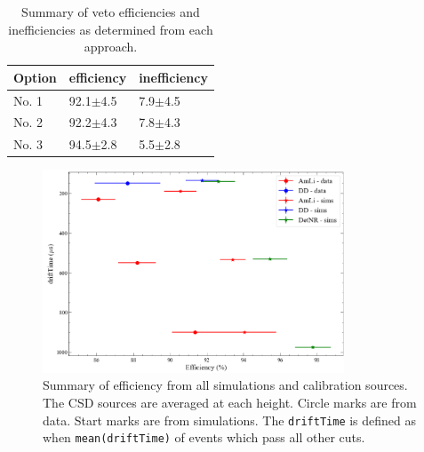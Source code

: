 \begin{table}
\begin{tabular}{l|l|l}
Option & efficiency & inefficiency \\ \hline
No. 1  & 92.1$\pm$4.5 & 7.9$\pm$4.5\\
No. 2  & 92.2$\pm$4.3 & 7.8$\pm$4.3\\
No. 3  & 94.5$\pm$2.8 & 5.5$\pm$2.8
\end{tabular}
    \caption{Summary of veto efficiencies and inefficiencies as determined from each approach.}
    \label{tab:efficiency_options}
\end{table}

\begin{figure}
    \centering
    \includegraphics[width=0.8\textwidth]{figures/VetoEfficiency/efficiency_summary.png}
    \caption{Summary of efficiency from all simulations and calibration sources.
    The CSD sources are averaged at each height.
    Circle marks are from data.
    Start marks are from simulations.
    The \lstinline{driftTime} is defined as when \lstinline{mean(driftTime)} of events which pass all other cuts.
    }
    \label{fig:efficiency_summary}
\end{figure}